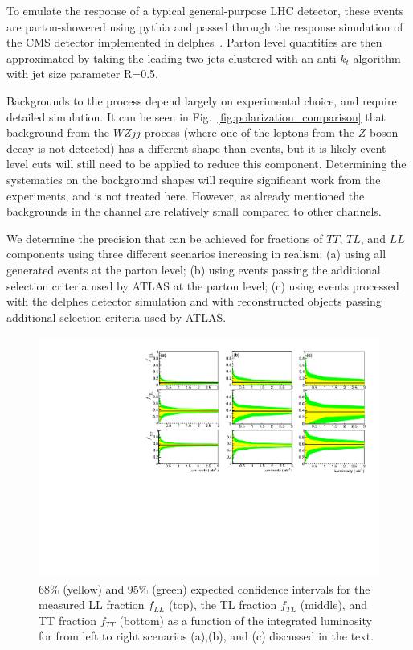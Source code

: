 To emulate the response of a typical general-purpose LHC detector, these events are parton-showered using {\sc pythia}\cite{pythia} and passed through the  response simulation of the CMS detector implemented in {\sc delphes}~\cite{delphes}. Parton level quantities are then approximated by taking the leading two jets clustered with an anti-$k_t$ algorithm~\cite{antikt} with jet size parameter R=0.5.

Backgrounds to the \ssWW process depend largely on experimental choice, and require detailed simulation. It can be seen in Fig.~\ref{fig:polarization_comparison} that background from the $WZjj$ process (where one of 
the leptons from the $Z$ boson decay is not detected) has a different \ctsNN shape than \ssWW events, but it is likely event level cuts will still need to be applied to reduce this component. Determining the systematics on the background shapes will require significant work from the experiments, and is not treated here. However, as already mentioned the backgrounds in the \ssWW channel are relatively small compared to other channels.


We determine the precision that can be achieved for fractions of $TT$, $TL$, and $LL$ components using three different scenarios increasing in realism: (a) using all  generated events at the parton level; 
(b) using events passing the additional selection criteria used by ATLAS at the parton level; 
(c) using events processed with the {\sc delphes} detector simulation and with reconstructed objects passing additional selection criteria used by \mbox{ATLAS}. 

\begin{figure}
\includegraphics[width=.9\textwidth]{./fig/12_LL_LT_TT.pdf}
\caption{ \label{fig:sensitivity} 68\% (yellow) and 95\% (green) expected confidence intervals for the measured LL fraction $f_{LL}$ (top), the TL fraction $f_{TL}$ (middle), and TT fraction $f_{TT}$ (bottom) as a function of the integrated luminosity for from left to right scenarios (a),(b), and (c) discussed in the text.}
\end{figure}

